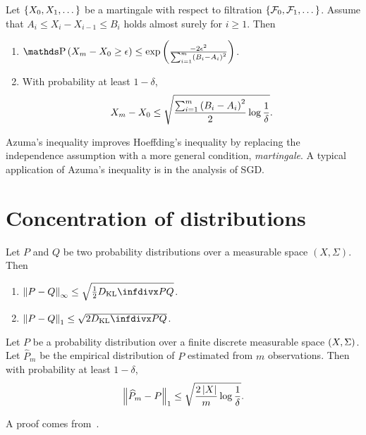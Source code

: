 \documentclass{article}
\begin{document}
\begin{thm}
Let $\left\{X_0, X_1, \dots\right\}$ be a martingale with respect to filtration $\left\{\mathcal{F}_0, \mathcal{F}_1, \dots\right\}$. 
Assume that $A_i \le X_i - X_{i-1} \le B_i$ holds almost surely for $i\ge 1$.
Then
\begin{enumerate}
\item 
$\prob{X_m - X_0 \ge \epsilon} \le \exp\bracket{\frac{-2\epsilon^2}{\sum_{i=1}^m \bracket{B_i-A_i}^2}}$.
\item With probability at least $1-\delta$,
\begin{align*}
X_m - X_0 \le \sqrt{\frac{\sum_{i=1}^m\left(B_i - A_i\right)^2}{2}\log\frac{1}{\delta}}.
\end{align*}
\end{enumerate}
\end{thm}
\begin{rmk}
Azuma's inequality improves Hoeffding's inequality by replacing the independence assumption with a more general condition, \emph{martingale}.
A typical application of Azuma's inequality is in the analysis of SGD.
\end{rmk}



\section{Concentration of distributions}

\begin{thm}
Let $P$ and $Q$ be two probability distributions over a measurable space $(X, \Sigma)$. Then
\begin{enumerate}
\item
$\norm{P - Q}_{\infty} \le \sqrt{\half \kld{P}{Q}}$.
\item
$\norm{P - Q}_{1} \le \sqrt{2 \kld{P}{Q}}$.
\end{enumerate}
\end{thm}


\begin{thm}
Let $P$ be a probability distribution over a finite discrete measurable space $\left(X,\Sigma\right)$. 
Let $\widehat{P}_m$ be the empirical distribution of $P$ estimated from $m$ observations.
Then with probability at least $1-\delta$,
\begin{align*}
    \left\|\widehat{P}_m - P\right\|_1 \le \sqrt{\frac{2\left|X\right|}{m}\log\frac{1}{\delta}}.
\end{align*}
\end{thm}
\begin{rmk}
A proof comes from~\cite{weissman2003inequalities}.
\end{rmk}




\end{document}

